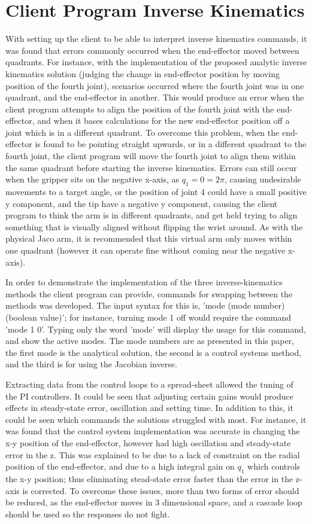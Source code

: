 \documentclass[12pt,openany,a4paper]{book}
\begin{document}
\section{Client Program Inverse Kinematics}
With setting up the client to be able to interpret inverse kinematics commands, it was found that errors commonly occurred when the end-effector moved between quadrants.  For instance, with the implementation of the proposed analytic inverse kinematics solution (judging the change in end-effector position by moving position of the fourth joint), scenarios occurred where the fourth joint was in one quadrant, and the end-effector in another. This would produce an error when the client program attempts to align the position of the fourth joint with the end-effector, and when it bases calculations for the new end-effector position off a joint which is in a different quadrant. To overcome this problem, when the end-effector is found to be pointing straight upwards, or in a different quadrant to the fourth joint, the client program will move the fourth joint to align them within the same quadrant before starting the inverse kinematics. Errors can still occur when the gripper sits on the negative x-axis, as $q_1 = 0 = 2\pi$, causing undesirable movements to a target angle, or the position of joint 4 could have a small positive y component, and the tip have a negative y component, causing the client program to think the arm is in different quadrants, and get held trying to align something that is visually aligned without flipping the wrist around. As with the physical Jaco arm, it is recommended that this virtual arm only moves within one quadrant (however it can operate fine without coming near the negative x-axis).


In order to demonstrate the implementation of the three inverse-kinematics methods the client program can provide, commands for swapping between the methods was developed. The input syntax for this is, 'mode (mode number) (boolean value)'; for instance, turning mode 1 off would require the command 'mode 1 0'. Typing only the word 'mode' will display the usage for this command, and show the active modes. The mode numbers are as presented in this paper, the first mode is the analytical solution, the second is a control systems method, and the third is for using the Jacobian inverse.


Extracting data from the control loops to a spread-sheet allowed the tuning of the PI controllers. It could be seen that adjusting certain gains would produce effects in steady-state error, oscillation and setting time. In addition to this, it could be seen which commands the solutions struggled with most. For instance, it was found that the control system implementation was accurate in changing the x-y position of the end-effector, however had high oscillation and steady-state error in the z. This was explained to be due to a lack of constraint on the radial position of the end-effector, and due to a high integral gain on $q_1$ which controls the x-y position; thus eliminating stead-state error faster than the error in the z-axis is corrected. To overcome these issues, more than two forms of error should be reduced, as the end-effector moves in 3 dimensional space, and a cascade loop should be used so the responses do not fight.
\end{document}
